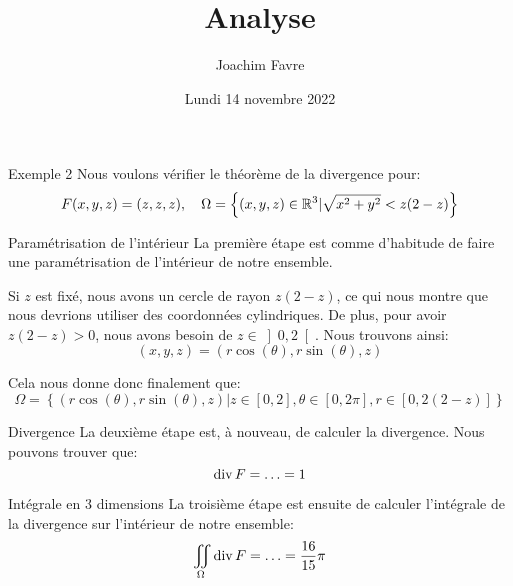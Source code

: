 \documentclass[a4paper]{article}
\title{Analyse}
\author{Joachim Favre}
\date{Lundi 14 novembre 2022}
\begin{document}
\maketitle


\begin{parag}{Exemple 2}
    Nous voulons vérifier le théorème de la divergence pour: 
    \[F\left(x, y, z\right) = \left(z, z, z\right), \mathspace \Omega = \left\{\left(x, y, z\right) \in \mathbb{R}^3 | \sqrt{x^2 + y^2} < z\left(2 - z\right)\right\}\]
    
    \begin{subparag}{Paramétrisation de l'intérieur}
        La première étape est comme d'habitude de faire une paramétrisation de l'intérieur de notre ensemble. 

        Si $z$ est fixé, nous avons un cercle de rayon $z\left(2 - z\right)$, ce qui nous montre que nous devrions utiliser des coordonnées cylindriques. De plus, pour avoir $z\left(2 -z\right) > 0$, nous avons besoin de $z \in \left]0, 2\right[ $. Nous trouvons ainsi: 
        \[\left(x, y, z\right) = \left(r\cos\left(\theta\right), r\sin\left(\theta\right), z\right)\]
        
        Cela nous donne donc finalement que:
        \[\Omega = \left\{\left(r\cos\left(\theta\right), r\sin\left(\theta\right), z\right) | z \in \left[0, 2\right], \theta \in \left[0, 2\pi\right], r \in \left[0, 2\left(2 - z\right)\right]\right\}\]
    \end{subparag}

    \begin{subparag}{Divergence}
        La deuxième étape est, à nouveau, de calculer la divergence. Nous pouvons trouver que: 
        \[\operatorname{div} F = \ldots = 1\]
    \end{subparag}
    
    \begin{subparag}{Intégrale en 3 dimensions}
        La troisième étape est ensuite de calculer l'intégrale de la divergence sur l'intérieur de notre ensemble: 
        \[\iint_{\Omega} \operatorname{div} F = \ldots = \frac{16}{15} \pi\]
    \end{subparag}


\end{parag}
\end{document}
